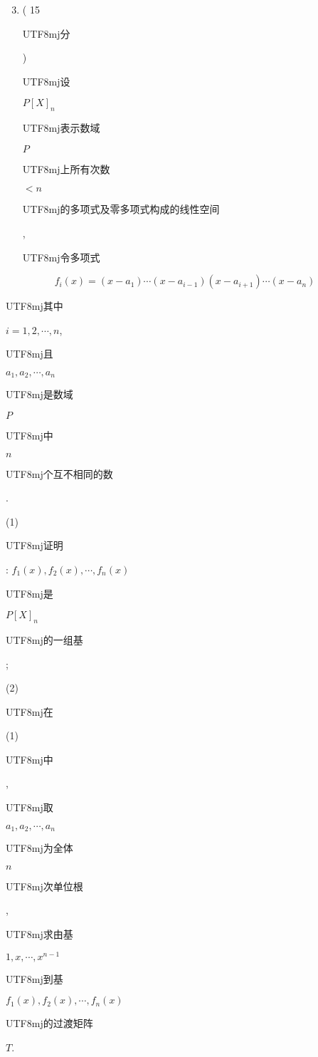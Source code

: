 \documentclass[10pt]{article}
\begin{document}
\begin{enumerate}
  \setcounter{enumi}{2}
  \item ( 15 \begin{CJK}{UTF8}{mj}分\end{CJK}) \begin{CJK}{UTF8}{mj}设\end{CJK} $P[X]_{n}$ \begin{CJK}{UTF8}{mj}表示数域\end{CJK} $P$ \begin{CJK}{UTF8}{mj}上所有次数\end{CJK} $<n$ \begin{CJK}{UTF8}{mj}的多项式及零多项式构成的线性空间\end{CJK}, \begin{CJK}{UTF8}{mj}令多项式\end{CJK}
\end{enumerate}
$$
f_{i}(x)=\left(x-a_{1}\right) \cdots\left(x-a_{i-1}\right)\left(x-a_{i+1}\right) \cdots\left(x-a_{n}\right)
$$
\begin{CJK}{UTF8}{mj}其中\end{CJK} $i=1,2, \cdots, n$, \begin{CJK}{UTF8}{mj}且\end{CJK} $a_{1}, a_{2}, \cdots, a_{n}$ \begin{CJK}{UTF8}{mj}是数域\end{CJK} $P$ \begin{CJK}{UTF8}{mj}中\end{CJK} $n$ \begin{CJK}{UTF8}{mj}个互不相同的数\end{CJK}.

(1) \begin{CJK}{UTF8}{mj}证明\end{CJK}: $f_{1}(x), f_{2}(x), \cdots, f_{n}(x)$ \begin{CJK}{UTF8}{mj}是\end{CJK} $P[X]_{n}$ \begin{CJK}{UTF8}{mj}的一组基\end{CJK};

(2) \begin{CJK}{UTF8}{mj}在\end{CJK} (1) \begin{CJK}{UTF8}{mj}中\end{CJK}, \begin{CJK}{UTF8}{mj}取\end{CJK} $a_{1}, a_{2}, \cdots, a_{n}$ \begin{CJK}{UTF8}{mj}为全体\end{CJK} $n$ \begin{CJK}{UTF8}{mj}次单位根\end{CJK}, \begin{CJK}{UTF8}{mj}求由基\end{CJK} $1, x, \cdots, x^{n-1}$ \begin{CJK}{UTF8}{mj}到基\end{CJK} $f_{1}(x), f_{2}(x), \cdots, f_{n}(x)$ \begin{CJK}{UTF8}{mj}的过渡矩阵\end{CJK} $T$.
\end{document}
